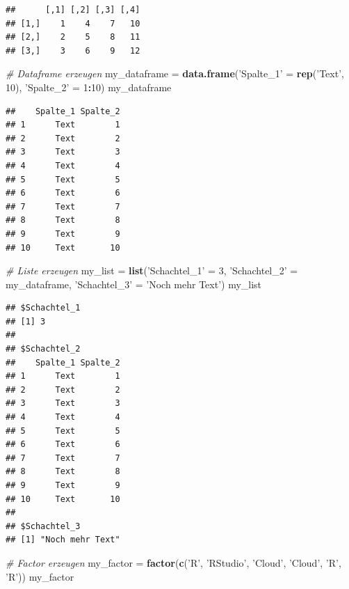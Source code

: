 \documentclass[]{book}
\newenvironment{Shaded}{\begin{snugshade}}{\end{snugshade}}
\newcommand{\CommentTok}[1]{\textcolor[rgb]{0.56,0.35,0.01}{\textit{#1}}}
\newcommand{\DecValTok}[1]{\textcolor[rgb]{0.00,0.00,0.81}{#1}}
\newcommand{\KeywordTok}[1]{\textcolor[rgb]{0.13,0.29,0.53}{\textbf{#1}}}
\newcommand{\NormalTok}[1]{#1}
\newcommand{\OperatorTok}[1]{\textcolor[rgb]{0.81,0.36,0.00}{\textbf{#1}}}
\newcommand{\StringTok}[1]{\textcolor[rgb]{0.31,0.60,0.02}{#1}}
\begin{document}
\begin{verbatim}
##      [,1] [,2] [,3] [,4]
## [1,]    1    4    7   10
## [2,]    2    5    8   11
## [3,]    3    6    9   12
\end{verbatim}

\begin{Shaded}
\begin{Highlighting}[]
\CommentTok{# Dataframe erzeugen}
\NormalTok{my_dataframe =}\StringTok{ }\KeywordTok{data.frame}\NormalTok{(}\StringTok{'Spalte_1'}\NormalTok{ =}\StringTok{ }\KeywordTok{rep}\NormalTok{(}\StringTok{'Text'}\NormalTok{, }\DecValTok{10}\NormalTok{),}
                          \StringTok{'Spalte_2'}\NormalTok{ =}\StringTok{ }\DecValTok{1}\OperatorTok{:}\DecValTok{10}\NormalTok{)}
\NormalTok{my_dataframe}
\end{Highlighting}
\end{Shaded}

\begin{verbatim}
##    Spalte_1 Spalte_2
## 1      Text        1
## 2      Text        2
## 3      Text        3
## 4      Text        4
## 5      Text        5
## 6      Text        6
## 7      Text        7
## 8      Text        8
## 9      Text        9
## 10     Text       10
\end{verbatim}

\begin{Shaded}
\begin{Highlighting}[]
\CommentTok{# Liste erzeugen}
\NormalTok{my_list =}\StringTok{ }\KeywordTok{list}\NormalTok{(}\StringTok{'Schachtel_1'}\NormalTok{ =}\StringTok{ }\DecValTok{3}\NormalTok{, }\StringTok{'Schachtel_2'}\NormalTok{ =}\StringTok{ }\NormalTok{my_dataframe,}
               \StringTok{'Schachtel_3'}\NormalTok{ =}\StringTok{ 'Noch mehr Text'}\NormalTok{)}
\NormalTok{my_list}
\end{Highlighting}
\end{Shaded}

\begin{verbatim}
## $Schachtel_1
## [1] 3
## 
## $Schachtel_2
##    Spalte_1 Spalte_2
## 1      Text        1
## 2      Text        2
## 3      Text        3
## 4      Text        4
## 5      Text        5
## 6      Text        6
## 7      Text        7
## 8      Text        8
## 9      Text        9
## 10     Text       10
## 
## $Schachtel_3
## [1] "Noch mehr Text"
\end{verbatim}

\begin{Shaded}
\begin{Highlighting}[]
\CommentTok{# Factor erzeugen}
\NormalTok{my_factor =}\StringTok{ }\KeywordTok{factor}\NormalTok{(}\KeywordTok{c}\NormalTok{(}\StringTok{'R'}\NormalTok{, }\StringTok{'RStudio'}\NormalTok{, }\StringTok{'Cloud'}\NormalTok{, }\StringTok{'Cloud'}\NormalTok{, }\StringTok{'R'}\NormalTok{, }\StringTok{'R'}\NormalTok{))}
\NormalTok{my_factor}
\end{Highlighting}
\end{Shaded}
\end{document}
